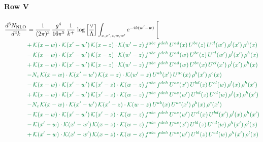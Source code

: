 \documentclass[10pt]{article}
\numberwithin{equation}{section}
\begin{document}
\paragraph{Row V}
\begin{align}
\frac{d^{3}N_{\mathrm{NLO}}}{d^{3}k} & = \frac{1}{(2\pi)^{3}}\,\frac{g^{4}}{16\pi^{5}}\,\frac{1}{k^{+}}\,\log\Big[\frac{\vee}{\Lambda}\Big]\int_{x,x',z,w,w'}e^{-ik(w'-w)}\,\Bigg[\notag\\ &{\color{JIM}  +\,\mathcal{K}(x-w)\cdot\mathcal{K}(x'-w')\,\mathcal{K}(x-z)\cdot\mathcal{K}(w'-z)\,f^{abc}\,f^{deh}\,U^{ad}(x)\,U^{be}(z)\,U^{cl}(w')\,\rho^{l}(x')\,\rho^{h}(x)} \notag\\
&{\color{JIM} -\,\mathcal{K}(x-w)\cdot\mathcal{K}(x'-w')\,\mathcal{K}(x-z)\cdot\mathcal{K}(w'-z)\,f^{abc}\,f^{deh}\,U^{ad}(w)\,U^{be}(z)\,U^{cl}(w')\,\rho^{l}(x')\,\rho^{h}(x)} \notag\\
&{\color{JIM} +\,\mathcal{K}(x-w)\cdot\mathcal{K}(x'-w')\,\mathcal{K}(x-z)\cdot\mathcal{K}(w'-z)\,f^{abc}\,f^{deh}\,U^{ad}(w)\,U^{be}(x)\,U^{cl}(x')\,\rho^{l}(x')\,\rho^{h}(x)} \notag\\
&{\color{JIM} -N_{c}\,\mathcal{K}(x-w)\cdot\mathcal{K}(x'-w')\,\mathcal{K}(x-z)\cdot\mathcal{K}(w'-z)\,U^{ab}(x')\,U^{ac}(x)\,\rho^{b}(x')\,\rho^{c}(x)} \notag\\
&{\color{JIM} -\,\mathcal{K}(x-w)\cdot\mathcal{K}(x'-w')\,\mathcal{K}(x'-z)\cdot\mathcal{K}(w-z)\,f^{abc}\,f^{deh}\,U^{ae}(x')\,U^{bd}(z)\,U^{cl}(w)\,\rho^{l}(x)\,\rho^{h}(x')} \notag\\
&{\color{JIM} +\,\mathcal{K}(x-w)\cdot\mathcal{K}(x'-w')\,\mathcal{K}(x'-z)\cdot\mathcal{K}(w-z)\,f^{abc}\,f^{deh}\,U^{ae}(w')\,U^{bd}(z)\,U^{cl}(w)\,\rho^{l}(x)\,\rho^{h}(x')} \notag\\
&{\color{JIM} -N_{c}\,\mathcal{K}(x-w)\cdot\mathcal{K}(x'-w')\,\mathcal{K}(x'-z)\cdot\mathcal{K}(w-z)\,U^{ab}(x)\,U^{ac}(x')\,\rho^{b}(x)\,\rho^{c}(x')} \notag\\
&{\color{JIM} -\,\mathcal{K}(x-w)\cdot\mathcal{K}(x'-w')\,\mathcal{K}(x'-z)\cdot\mathcal{K}(w-z)\,f^{abc}\,f^{deh}\,U^{ae}(w')\,U^{cl}(x)\,U^{bd}(x')\,\rho^{l}(x)\,\rho^{h}(x')} \notag\\
&{\color{JIM} -\,\mathcal{K}(x'-w)\cdot\mathcal{K}(x'-w')\,\mathcal{K}(x-z)\cdot\mathcal{K}(w-z)\,f^{abc}\,f^{deh}\,U^{ae}(x')\,U^{bl}(z)\,U^{cd}(w)\,\rho^{h}(x')\,\rho^{l}(x)} \notag\\
&{\color{JIM} +\,\mathcal{K}(x'-w)\cdot\mathcal{K}(x'-w')\,\mathcal{K}(x-z)\cdot\mathcal{K}(w-z)\,f^{abc}\,f^{deh}\,U^{ae}(w')\,U^{bl}(z)\,U^{cd}(w)\,\rho^{h}(x')\,\rho^{l}(x)} \notag\\

\end{align}
\end{document}
